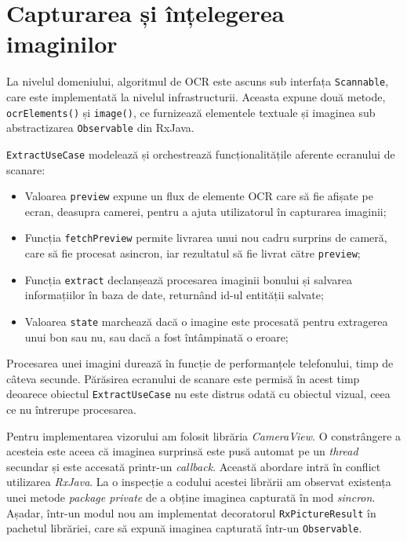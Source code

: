 \section{Capturarea și înțelegerea imaginilor}

La nivelul domeniului, algoritmul de OCR este ascuns sub interfața \texttt{Scannable}, care este implementată la nivelul infrastructurii. Aceasta expune două metode, \texttt{ocrElements()} și \texttt{image()}, ce furnizează elementele textuale și imaginea sub abstractizarea \texttt{Observable} din RxJava.



\texttt{ExtractUseCase} modelează și orchestrează funcționalitățile aferente ecranului de scanare:

\begin{itemize}
  \item 
  Valoarea \texttt{preview} expune un flux de elemente OCR care să fie afișate pe ecran, deasupra camerei, pentru a ajuta utilizatorul în capturarea imaginii;

  \item
  Funcția \texttt{fetchPreview} permite livrarea unui nou cadru surprins de cameră, care să fie procesat asincron, iar rezultatul să fie livrat către \texttt{preview};

  \item
  Funcția \texttt{extract} declanșează procesarea imaginii bonului și salvarea informațiilor în baza de date, returnând id-ul entității salvate;

  \item
  Valoarea \texttt{state} marchează dacă o imagine este procesată pentru extragerea unui bon sau nu, sau dacă a fost întâmpinată o eroare;
\end{itemize}

Procesarea unei imagini durează în funcție de performanțele telefonului, timp de câteva secunde. Părăsirea ecranului de scanare este permisă în acest timp deoarece obiectul \texttt{ExtractUseCase} nu este distrus odată cu obiectul vizual, ceea ce nu întrerupe procesarea.

Pentru implementarea vizorului am folosit librăria \emph{CameraView}\cite{CameraView}. O constrângere a acesteia este aceea că imaginea surprinsă este pusă automat pe un \emph{thread} secundar și este accesată printr-un \emph{callback}. Această abordare intră în conflict utilizarea \emph{RxJava}. La o inspecție a codului acestei librării am observat existența unei metode \emph{package private} de a obține imaginea capturată în mod \emph{sincron}. Așadar, într-un modul nou am implementat decoratorul \texttt{RxPictureResult} în pachetul librăriei, care să expună imaginea capturată într-un \texttt{Observable}.

